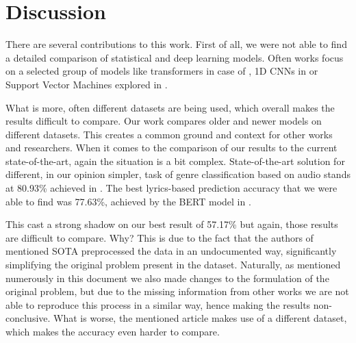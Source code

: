 \section{Discussion}\label{discussion}
There are several contributions to this work. First of all, we were not able to find a detailed comparison of statistical and deep learning models. Often works focus on a selected group of models like transformers in case of \cite{sig_bert}, 1D CNNs in \cite{audio_1dcnn} or Support Vector Machines explored in \cite{oldAudio}.

What is more, often different datasets are being used, which overall makes the results difficult to compare. Our work compares older and newer models on different datasets. This creates a common ground and context for other works and researchers. When it comes to the comparison of our results to the current state-of-the-art, again the situation is a bit complex. State-of-the-art solution for different, in our opinion simpler, task of genre classification based on audio stands at 80.93\% achieved in \cite{audio_1dcnn}. The best lyrics-based prediction accuracy that we were able to find was 77.63\%, achieved by the BERT model in \cite{sig_bert}.

This cast a strong shadow on our best result of 57.17\% but again, those results are difficult to compare. Why? This is due to the fact that the authors of mentioned SOTA preprocessed the data in an undocumented way, significantly simplifying the original problem present in the dataset. Naturally, as mentioned numerously in this document we also made changes to the formulation of the original problem, but due to the missing information from other works we are not able to reproduce this process in a similar way, hence making the results non-conclusive. What is worse, the mentioned article makes use of a different dataset, which makes the accuracy even harder to compare. 

